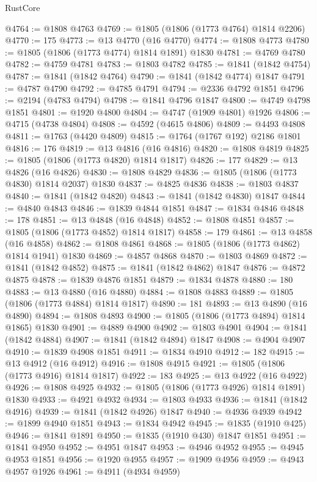 \begin{lexlean}{RustCore}
\begin{coremodule}
@4764 := @1808 @4763
@4769 := @1805 (@1806 (@1773 @4764) @1814 @2206)
@4770 := 175
@4773 := @13 @4770 (@16 @4770)
@4774 := @1808 @4773
@4780 := @1805 (@1806 (@1773 @4774) @1814 @1891) @1830
@4781 := @4769 @4780
@4782 := @4759 @4781
@4783 := @1803 @4782
@4785 := @1841 (@1842 @4754)
@4787 := @1841 (@1842 @4764)
@4790 := @1841 (@1842 @4774) @1847
@4791 := @4787 @4790
@4792 := @4785 @4791
@4794 := @2336 @4792 @1851
@4796 := @2194 (@4783 @4794)
@4798 := @1841 @4796 @1847
@4800 := @4749 @4798 @1851
@4801 := @1920 @4800
@4804 := @4747 (@1909 @4801) @1926
@4806 := @4715 (@4738 @4804)
@4808 := @4592 (@4615 @4806)
@4809 := @4493 @4808
@4811 := @1763 (@4420 @4809)
@4815 := @1764 (@1767 @192) @2186 @1801
@4816 := 176
@4819 := @13 @4816 (@16 @4816)
@4820 := @1808 @4819
@4825 := @1805 (@1806 (@1773 @4820) @1814 @1817)
@4826 := 177
@4829 := @13 @4826 (@16 @4826)
@4830 := @1808 @4829
@4836 := @1805 (@1806 (@1773 @4830) @1814 @2037) @1830
@4837 := @4825 @4836
@4838 := @1803 @4837
@4840 := @1841 (@1842 @4820)
@4843 := @1841 (@1842 @4830) @1847
@4844 := @4840 @4843
@4846 := @1839 @4844 @1851
@4847 := @1834 @4846
@4848 := 178
@4851 := @13 @4848 (@16 @4848)
@4852 := @1808 @4851
@4857 := @1805 (@1806 (@1773 @4852) @1814 @1817)
@4858 := 179
@4861 := @13 @4858 (@16 @4858)
@4862 := @1808 @4861
@4868 := @1805 (@1806 (@1773 @4862) @1814 @1941) @1830
@4869 := @4857 @4868
@4870 := @1803 @4869
@4872 := @1841 (@1842 @4852)
@4875 := @1841 (@1842 @4862) @1847
@4876 := @4872 @4875
@4878 := @1839 @4876 @1851
@4879 := @1834 @4878
@4880 := 180
@4883 := @13 @4880 (@16 @4880)
@4884 := @1808 @4883
@4889 := @1805 (@1806 (@1773 @4884) @1814 @1817)
@4890 := 181
@4893 := @13 @4890 (@16 @4890)
@4894 := @1808 @4893
@4900 := @1805 (@1806 (@1773 @4894) @1814 @1865) @1830
@4901 := @4889 @4900
@4902 := @1803 @4901
@4904 := @1841 (@1842 @4884)
@4907 := @1841 (@1842 @4894) @1847
@4908 := @4904 @4907
@4910 := @1839 @4908 @1851
@4911 := @1834 @4910
@4912 := 182
@4915 := @13 @4912 (@16 @4912)
@4916 := @1808 @4915
@4921 := @1805 (@1806 (@1773 @4916) @1814 @1817)
@4922 := 183
@4925 := @13 @4922 (@16 @4922)
@4926 := @1808 @4925
@4932 := @1805 (@1806 (@1773 @4926) @1814 @1891) @1830
@4933 := @4921 @4932
@4934 := @1803 @4933
@4936 := @1841 (@1842 @4916)
@4939 := @1841 (@1842 @4926) @1847
@4940 := @4936 @4939
@4942 := @1899 @4940 @1851
@4943 := @1834 @4942
@4945 := @1835 (@1910 @425)
@4946 := @1841 @1891
@4950 := @1835 (@1910 @430) @1847 @1851
@4951 := @1841 @4950
@4952 := @4951 @1847
@4953 := @4946 @4952
@4955 := @4945 @4953 @1851
@4956 := @1920 @4955
@4957 := @1909 @4956
@4959 := @4943 @4957 @1926
@4961 := @4911 (@4934 @4959)

\end{coremodule}
\end{lexlean}
